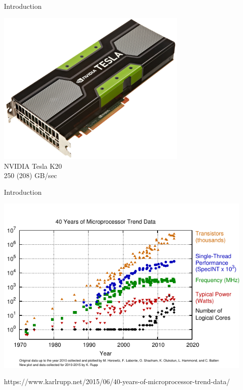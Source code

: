 \begin{frame}{Introduction}
\begin{minipage}{0.3\textwidth}
\begin{center}
    \end{center}
   \end{minipage}
   \hspace{0.2cm}
%
   \begin{minipage}{0.3\textwidth}
    \begin{center}
     \includegraphics[width=0.7\textwidth]{figures/TeslaK20.jpg} \\ NVIDIA Tesla K20 \\ 250 (208) GB/sec
    \end{center}
   \end{minipage}


\end{frame}


\begin{frame}{Introduction}
 \vspace*{-0.5cm}
 \begin{center}
  \includegraphics[width=0.95\textwidth]{figures/40-years-processor-trend}
 \end{center}
 {\tiny https://www.karlrupp.net/2015/06/40-years-of-microprocessor-trend-data/ }
\end{frame}

